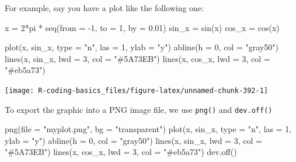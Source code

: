 \documentclass[
]{book}
\newenvironment{Shaded}{\begin{snugshade}}{\end{snugshade}}
\newcommand{\AttributeTok}[1]{\textcolor[rgb]{0.77,0.63,0.00}{#1}}
\newcommand{\DecValTok}[1]{\textcolor[rgb]{0.00,0.00,0.81}{#1}}
\newcommand{\FloatTok}[1]{\textcolor[rgb]{0.00,0.00,0.81}{#1}}
\newcommand{\FunctionTok}[1]{\textcolor[rgb]{0.00,0.00,0.00}{#1}}
\newcommand{\NormalTok}[1]{#1}
\newcommand{\OtherTok}[1]{\textcolor[rgb]{0.56,0.35,0.01}{#1}}
\newcommand{\SpecialCharTok}[1]{\textcolor[rgb]{0.00,0.00,0.00}{#1}}
\newcommand{\StringTok}[1]{\textcolor[rgb]{0.31,0.60,0.02}{#1}}
\begin{document}
For example, say you have a plot like the following one:

\begin{Shaded}
\begin{Highlighting}[]
\NormalTok{x }\OtherTok{=} \DecValTok{2}\SpecialCharTok{*}\NormalTok{pi }\SpecialCharTok{*} \FunctionTok{seq}\NormalTok{(}\AttributeTok{from =} \SpecialCharTok{{-}}\DecValTok{1}\NormalTok{, }\AttributeTok{to =} \DecValTok{1}\NormalTok{, }\AttributeTok{by =} \FloatTok{0.01}\NormalTok{)}
\NormalTok{sin\_x }\OtherTok{=} \FunctionTok{sin}\NormalTok{(x)}
\NormalTok{cos\_x }\OtherTok{=} \FunctionTok{cos}\NormalTok{(x)}

\FunctionTok{plot}\NormalTok{(x, sin\_x, }\AttributeTok{type =} \StringTok{"n"}\NormalTok{, }\AttributeTok{las =} \DecValTok{1}\NormalTok{, }\AttributeTok{ylab =} \StringTok{"y"}\NormalTok{)}
\FunctionTok{abline}\NormalTok{(}\AttributeTok{h =} \DecValTok{0}\NormalTok{, }\AttributeTok{col =} \StringTok{"gray50"}\NormalTok{)}
\FunctionTok{lines}\NormalTok{(x, sin\_x, }\AttributeTok{lwd =} \DecValTok{3}\NormalTok{, }\AttributeTok{col =} \StringTok{"\#5A73EB"}\NormalTok{)}
\FunctionTok{lines}\NormalTok{(x, cos\_x, }\AttributeTok{lwd =} \DecValTok{3}\NormalTok{, }\AttributeTok{col =} \StringTok{"\#eb5a73"}\NormalTok{)}
\end{Highlighting}
\end{Shaded}

\begin{center}\texttt{[image: R-coding-basics\_files/figure-latex/unnamed-chunk-392-1]} \end{center}

To export the graphic into a PNG image file, we use \texttt{png()} and \texttt{dev.off()}

\begin{Shaded}
\begin{Highlighting}[]
\FunctionTok{png}\NormalTok{(}\AttributeTok{file =} \StringTok{"myplot.png"}\NormalTok{, }\AttributeTok{bg =} \StringTok{"transparent"}\NormalTok{)}
\FunctionTok{plot}\NormalTok{(x, sin\_x, }\AttributeTok{type =} \StringTok{"n"}\NormalTok{, }\AttributeTok{las =} \DecValTok{1}\NormalTok{, }\AttributeTok{ylab =} \StringTok{"y"}\NormalTok{)}
\FunctionTok{abline}\NormalTok{(}\AttributeTok{h =} \DecValTok{0}\NormalTok{, }\AttributeTok{col =} \StringTok{"gray50"}\NormalTok{)}
\FunctionTok{lines}\NormalTok{(x, sin\_x, }\AttributeTok{lwd =} \DecValTok{3}\NormalTok{, }\AttributeTok{col =} \StringTok{"\#5A73EB"}\NormalTok{)}
\FunctionTok{lines}\NormalTok{(x, cos\_x, }\AttributeTok{lwd =} \DecValTok{3}\NormalTok{, }\AttributeTok{col =} \StringTok{"\#eb5a73"}\NormalTok{)}
\FunctionTok{dev.off}\NormalTok{()}
\end{Highlighting}
\end{Shaded}
\end{document}
